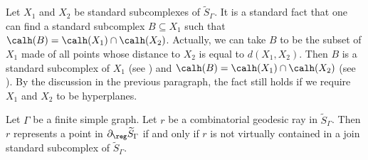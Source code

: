 Let $X_1$ and $X_2$ be standard subcomplexes of $\widetilde{S}_\Gamma$. It is a standard fact that one can find a standard subcomplex $B\subseteq X_1$ such that $\calh(B)=\calh(X_1)\cap \calh(X_2)$. Actually, we can take $B$ to be the subset of $X_1$ made of all points whose distance to $X_2$ is equal to $d(X_1,X_2)$. Then $B$ is a standard subcomplex of $X_1$ (see \cite[Lem.\,3.1]{Hua}) and $\calh(B)=\calh(X_1)\cap \calh(X_2)$ (see \eg \cite[Lem.\,2.14]{Hua3}). By the discussion in the previous paragraph, the fact still holds if we require $X_1$ and $X_2$ to be hyperplanes.

\begin{lemma}\label{lem:join subgroup}
Let $\Gamma$ be a finite simple graph. Let $r$ be a combinatorial geodesic ray in $\widetilde{S}_\Gamma$. Then $r$ represents a point in $\partial_\reg\widetilde{S}_\Gamma$ if and only if $r$ is not virtually contained in a join standard subcomplex of $\widetilde{S}_\Gamma$.
\end{lemma}

